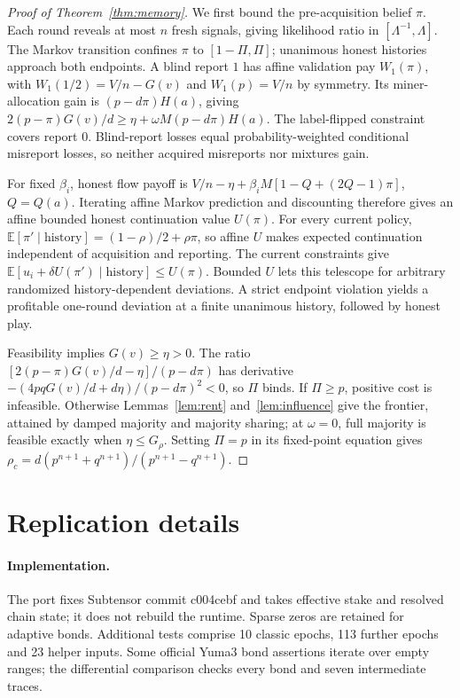 \documentclass[sigconf,anonymous,review]{acmart}
\numberwithin{equation}{section}
\newcommand{\E}{\mathbb{E}}
\begin{document}
\begin{proof}[Proof of Theorem~\ref{thm:memory}]
We first bound the pre-acquisition belief $\pi$. Each round reveals at most
$n$ fresh signals, giving likelihood ratio in $[\Lambda^{-1},\Lambda]$.
The Markov transition confines $\pi$ to $[1-\Pi,\Pi]$; unanimous honest
histories approach both endpoints. A blind report $1$ has affine validation
pay $W_1(\pi)$, with $W_1(1/2)=V/n-G(v)$ and $W_1(p)=V/n$ by symmetry.
Its miner-allocation gain is $(p-d\pi)H(a)$, giving
$2(p-\pi)G(v)/d\ge\eta+\omega M(p-d\pi)H(a)$.
The label-flipped constraint covers report $0$. Blind-report losses equal
probability-weighted conditional misreport losses, so neither acquired
misreports nor mixtures gain.

For fixed $\beta_i$, honest flow payoff is
$V/n-\eta+\beta_iM[1-Q+(2Q-1)\pi]$, $Q=Q(a)$.
Iterating affine Markov prediction and discounting therefore gives an
affine bounded honest continuation value $U(\pi)$.
For every current policy, $\E[\pi'\mid\text{history}]=(1-\rho)/2+\rho\pi$,
so affine $U$ makes expected continuation independent of acquisition and
reporting. The current constraints give
$\E[u_i+\delta U(\pi')\mid\text{history}]\le U(\pi)$.
Bounded $U$ lets this telescope for arbitrary randomized history-dependent
deviations. A strict endpoint violation yields a profitable one-round
deviation at a finite unanimous history, followed by honest play.

Feasibility implies $G(v)\ge\eta>0$. The ratio
$[2(p-\pi)G(v)/d-\eta]/(p-d\pi)$ has derivative
$-(4pqG(v)/d+d\eta)/(p-d\pi)^2<0$, so $\Pi$ binds.
If $\Pi\ge p$, positive cost is infeasible. Otherwise
Lemmas~\ref{lem:rent} and~\ref{lem:influence} give the frontier, attained by
damped majority and majority sharing; at $\omega=0$, full majority is feasible
exactly when $\eta\le G_\rho$. Setting $\Pi=p$ in its fixed-point equation gives
$\rho_c=d(p^{n+1}+q^{n+1})/(p^{n+1}-q^{n+1})$.\qedhere
\end{proof}

\section{Replication details}
\label{app:replica}

\paragraph{Implementation.} The port fixes Subtensor commit c004cebf and
takes effective stake and resolved chain state; it does not rebuild the
runtime. Sparse zeros are retained for adaptive bonds. Additional tests
comprise 10 classic epochs, 113 further epochs and 23 helper inputs.
Some official Yuma3 bond assertions iterate over empty ranges; the
differential comparison checks every bond and seven intermediate traces.
\end{document}
